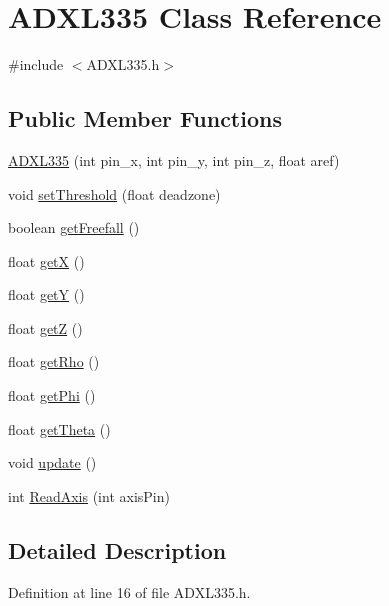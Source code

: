 \hypertarget{class_a_d_x_l335}{\section{\-A\-D\-X\-L335 \-Class \-Reference}
\label{class_a_d_x_l335}
}


{\ttfamily \#include $<$\-A\-D\-X\-L335.\-h$>$}

\subsection*{\-Public \-Member \-Functions}
\begin{DoxyCompactItemize}
\item 
\hyperlink{class_a_d_x_l335_aa0a1169afeba42b4608b0c34554a3a0d}{\-A\-D\-X\-L335} (int pin\-\_\-x, int pin\-\_\-y, int pin\-\_\-z, float aref)
\item 
void \hyperlink{class_a_d_x_l335_abdef27db9898fd645eb60354c41d210b}{set\-Threshold} (float deadzone)
\item 
boolean \hyperlink{class_a_d_x_l335_ac8df8ca6fd3ce24dc1ee6b4fa7f51bcf}{get\-Freefall} ()
\item 
float \hyperlink{class_a_d_x_l335_a229f47c6ec8f194f71e0856ae5311c52}{get\-X} ()
\item 
float \hyperlink{class_a_d_x_l335_a55ba0833f2effbdf93024d03f0bc738b}{get\-Y} ()
\item 
float \hyperlink{class_a_d_x_l335_a69dbff4695138b6ec4f9ce9821b7f5eb}{get\-Z} ()
\item 
float \hyperlink{class_a_d_x_l335_ab632b09e08ca40aecc622b8179ca2d82}{get\-Rho} ()
\item 
float \hyperlink{class_a_d_x_l335_af4dabbbe1818d065ebbce793b4c65a16}{get\-Phi} ()
\item 
float \hyperlink{class_a_d_x_l335_a2f7506d347e35db230b34318bbbaaa33}{get\-Theta} ()
\item 
void \hyperlink{class_a_d_x_l335_a93f217140a588e074c160f2d3151bad7}{update} ()
\item 
int \hyperlink{class_a_d_x_l335_ab7ec91be33daa5c7204d7b4763a9c1d8}{\-Read\-Axis} (int axis\-Pin)
\end{DoxyCompactItemize}


\subsection{\-Detailed \-Description}


\-Definition at line 16 of file \-A\-D\-X\-L335.\-h.




